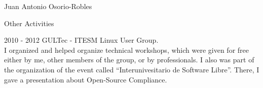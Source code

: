 \documentclass[english,10pt,letterpaper]{article}
\begin{document}
\begin{cv}{Juan Antonio Osorio-Robles}
	\begin{cvlist}{Other Activities}
		\item [2010 - 2012] GULTec - ITESM Linux User Group.\\
			I organized and helped organize technical workshops, which were
            given for free either by me, other members of the group, or by
            professionals. I also was part of the organization of the event
            called ``Interunivesitario de Software Libre''. There, I gave a
            presentation about Open-Source Compliance.
    \end{cvlist}

\end{cv}
\end{document}
